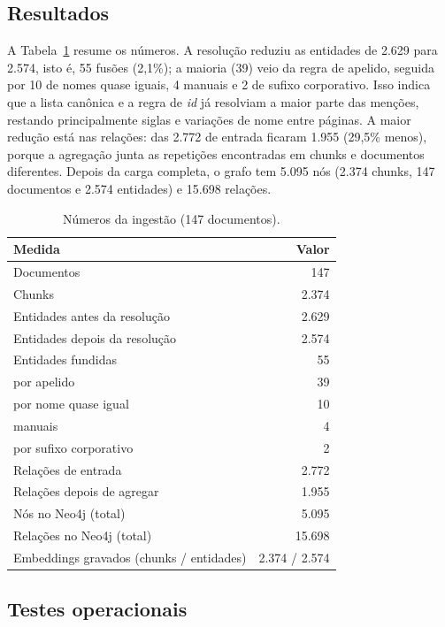 \subsection{Resultados}

A Tabela~\ref{tab:ingestao-numeros} resume os números. A resolução reduziu as entidades de 2.629 para 2.574, isto é, 55 fusões (2,1\%); a maioria (39) veio da regra de apelido, seguida por 10 de nomes quase iguais, 4 manuais e 2 de sufixo corporativo. Isso indica que a lista canônica e a regra de \emph{id} já resolviam a maior parte das menções, restando principalmente siglas e variações de nome entre páginas. A maior redução está nas relações: das 2.772 de entrada ficaram 1.955 (29,5\% menos), porque a agregação junta as repetições encontradas em chunks e documentos diferentes. Depois da carga completa, o grafo tem 5.095 nós (2.374 chunks, 147 documentos e 2.574 entidades) e 15.698 relações.

\begin{table}[ht]
\centering
\caption{Números da ingestão (147 documentos).}
\label{tab:ingestao-numeros}
\begin{tabular}{lr}
\hline
\textbf{Medida} & \textbf{Valor} \\
\hline
Documentos & 147 \\
Chunks & 2.374 \\
Entidades antes da resolução & 2.629 \\
Entidades depois da resolução & 2.574 \\
Entidades fundidas & 55 \\
\quad por apelido & 39 \\
\quad por nome quase igual & 10 \\
\quad manuais & 4 \\
\quad por sufixo corporativo & 2 \\
Relações de entrada & 2.772 \\
Relações depois de agregar & 1.955 \\
Nós no Neo4j (total) & 5.095 \\
Relações no Neo4j (total) & 15.698 \\
Embeddings gravados (chunks / entidades) & 2.374 / 2.574 \\
\hline
\end{tabular}
\end{table}

\subsection{Testes operacionais}

